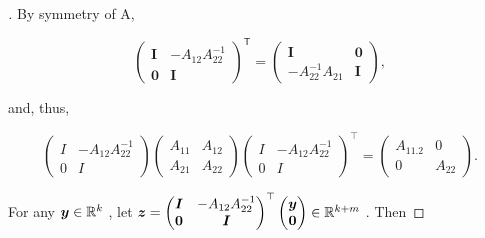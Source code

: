 \begin{proof}[]
By symmetry of A,

\[\begin{pmatrix} \mathbf{I} & -A_{12}A_{22}^{-1} \\ \mathbf{0} & \mathbf{I} \end{pmatrix}^{\mathsf{T}} = \begin{pmatrix} \mathbf{I} & \mathbf{0} \\ -A_{22}^{-1}A_{21} & \mathbf{I} \end{pmatrix},\]

and, thus,

\begin{equation}
    \label{eq:mat}
	\begin{pmatrix} I & -A_{12}A_{22}^{-1} \\ 0 & I \end{pmatrix} \begin{pmatrix} A_{11} & A_{12} \\ A_{21} & A_{22} \end{pmatrix} \begin{pmatrix} I & -A_{12}A_{22}^{-1} \\ 0 & I \end{pmatrix}^{\top} = \begin{pmatrix} A_{11.2} & 0 \\ 0 & A_{22} \end{pmatrix}.
\end{equation}

For any \(\boldsymbol{y} \in \mathbb{R}^k\) , let
\(\boldsymbol{z} = \begin{pmatrix} \boldsymbol{I} & -A_{12}A_{22}^{-1} \\ \boldsymbol{0} & \boldsymbol{I} \end{pmatrix}^{\top} \begin{pmatrix} \boldsymbol{y} \\ \boldsymbol{0} \end{pmatrix} \in \mathbb{R}^{k+m}\)
. Then


\end{proof}
